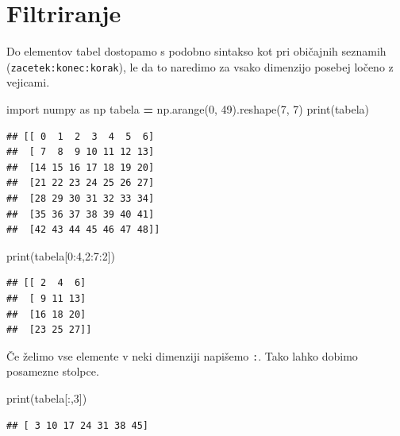 \documentclass[
]{book}
\newenvironment{Shaded}{\begin{snugshade}}{\end{snugshade}}
\newcommand{\BuiltInTok}[1]{#1}
\newcommand{\DecValTok}[1]{\textcolor[rgb]{0.00,0.00,0.81}{#1}}
\newcommand{\ImportTok}[1]{#1}
\newcommand{\NormalTok}[1]{#1}
\newcommand{\OperatorTok}[1]{\textcolor[rgb]{0.81,0.36,0.00}{\textbf{#1}}}
\begin{document}
\hypertarget{filtriranje}{%
\section{Filtriranje}\label{filtriranje}}

Do elementov tabel dostopamo s podobno sintakso kot pri običajnih seznamih
(\texttt{zacetek:konec:korak}), le da to naredimo za vsako dimenzijo posebej ločeno z vejicami.

\begin{Shaded}
\begin{Highlighting}[]
\ImportTok{import}\NormalTok{ numpy }\ImportTok{as}\NormalTok{ np}
\NormalTok{tabela }\OperatorTok{=}\NormalTok{ np.arange(}\DecValTok{0}\NormalTok{, }\DecValTok{49}\NormalTok{).reshape(}\DecValTok{7}\NormalTok{, }\DecValTok{7}\NormalTok{)}
\BuiltInTok{print}\NormalTok{(tabela)}
\end{Highlighting}
\end{Shaded}

\begin{verbatim}
## [[ 0  1  2  3  4  5  6]
##  [ 7  8  9 10 11 12 13]
##  [14 15 16 17 18 19 20]
##  [21 22 23 24 25 26 27]
##  [28 29 30 31 32 33 34]
##  [35 36 37 38 39 40 41]
##  [42 43 44 45 46 47 48]]
\end{verbatim}

\begin{Shaded}
\begin{Highlighting}[]
\BuiltInTok{print}\NormalTok{(tabela[}\DecValTok{0}\NormalTok{:}\DecValTok{4}\NormalTok{,}\DecValTok{2}\NormalTok{:}\DecValTok{7}\NormalTok{:}\DecValTok{2}\NormalTok{])}
\end{Highlighting}
\end{Shaded}

\begin{verbatim}
## [[ 2  4  6]
##  [ 9 11 13]
##  [16 18 20]
##  [23 25 27]]
\end{verbatim}

Če želimo vse elemente v neki dimenziji napišemo \texttt{:}. Tako lahko dobimo posamezne stolpce.

\begin{Shaded}
\begin{Highlighting}[]
\BuiltInTok{print}\NormalTok{(tabela[:,}\DecValTok{3}\NormalTok{])}
\end{Highlighting}
\end{Shaded}

\begin{verbatim}
## [ 3 10 17 24 31 38 45]
\end{verbatim}
\end{document}
